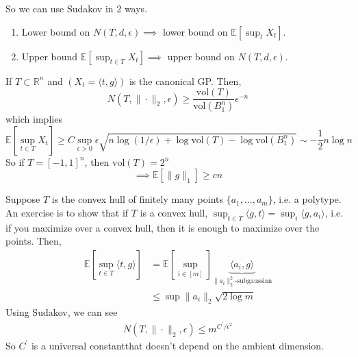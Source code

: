 	So we can use Sudakov in 2 ways. 
	\begin{enumerate}
		\item Lower bound on $N(T, d, \epsilon) \implies$ lower bound on $\mathbb{E}[\sup_t X_t]$. 
		\item Upper bound $\mathbb{E}[\sup_{t \in T} X_t] \implies$ upper bound on $N(T, d, \epsilon)$. 
	\end{enumerate}

	\begin{example}
		If $T \subset \mathbb{R}^n$ and $(X_t = \langle t, g \rangle)$ is the canonical GP. Then, 
		\begin{equation}
			N(T, \|\cdot\|_2, \epsilon) \geq \frac{\mathrm{vol}(T)}{\mathrm{vol}(B^n_1)} \epsilon^{-n}
		\end{equation}
		which implies 
		\begin{equation}
			\mathbb{E}[\sup_{t \in T} X_t] \geq C \sup_{\epsilon > 0} \epsilon \sqrt{n \log(1/\epsilon) + \log{\mathrm{vol}(T)} - \log{\mathrm{vol}(B_1^n)}} \sim -\frac{1}{2} n \log{n}
		\end{equation}
		So if $T = [-1, 1]^n$, then $\mathrm{vol}(T) = 2^n$ 
		\begin{equation}
			\implies \mathbb{E}[\|g\|_1] \geq cn
		\end{equation}
	\end{example}
	
	\begin{example}
		Suppose $T$ is the convex hull of finitely many points $\{a_1, \ldots, a_m\}$, i.e. a polytype. An exercise is to show that if $T$ is a convex hull, $\sup_{t \in T} \langle g, t \rangle = \sup_i \langle g, a_i \rangle$, i.e. if you maximize over a convex hull, then it is enough to maximize over the points. Then, 
		\begin{align}
			\mathbb{E}[\sup_{t \in T} \langle t, g \rangle] & = \mathbb{E}[\sup_{i \in [m]}] \underbrace{\langle a_i, g \rangle}_{\|a_i\|_2^2\text{-subgaussian}} \\ 
																											& \leq \sup \|a_i\|_2 \sqrt{2 \log{m}}
		\end{align}
		Using Sudakov, we can see 
		\begin{align}
			N(T, \|\cdot\|_2, \epsilon) \leq m^{C^\prime/\epsilon^2}  
		\end{align}
		So $C^\prime$ is a universal constantthat doesn't depend on the ambient dimension. 
	\end{example}

